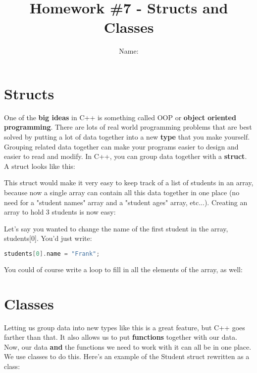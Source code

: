 \documentclass[a4paper,12pt]{article} %
\title{\textbf{Homework \#7 - Structs and Classes}}
\author{Name: }
\date{} %
\begin{document}
\maketitle %

\section{Structs}

One of the \textbf{big ideas} in C++ is something called OOP or \textbf{object oriented programming}. There are lots of real world programming problems that are best solved by putting a lot of data together into a new \textbf{type} that you make yourself. Grouping related data together can make your programs easier to design and easier to read and modify. In C++, you can group data together with a \textbf{struct}. A struct looks like this:

\vspace{5mm}


\noindent
This struct would make it very easy to keep track of a list of students in an array, because now a single array can contain all this data together in one place (no need for a "student names" array and a "student ages" array, etc...). Creating an array to hold 3 students is now easy:

\vspace{5mm}


\noindent
Let's say you wanted to change the name of the first student in the array, students[0]. You'd just write:

\vspace{5mm}
\begin{lstlisting}[language=C++]
students[0].name = "Frank";
\end{lstlisting}

\noindent
You could of course write a loop to fill in all the elements of the array, as well:

\vspace{5mm}


\section{Classes}

Letting us group data into new types like this is a great feature, but C++ goes farther than that. It also allows us to put \textbf{functions} together with our data. Now, our data \textbf{and} the functions we need to work with it can all be in one place. We use classes to do this. Here's an example of the Student struct rewritten as a class:
\end{document}
